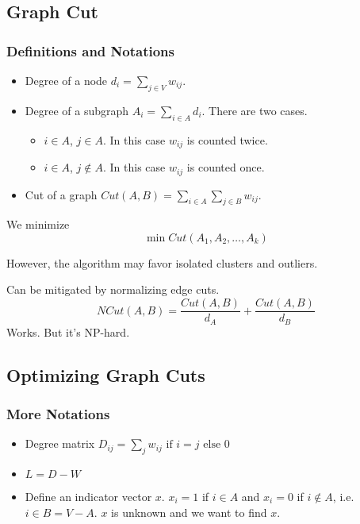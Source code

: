     \subsection{Graph Cut}
        \subsubsection{Definitions and Notations}
            \begin{itemize}
                \item Degree of a node $d_i = \sum_{j\in V}w_{ij}$.
                \item Degree of a subgraph $A_i = \sum_{i \in A}d_i$. There are two cases.
                    \begin{itemize}
                        \item $i \in A$, $j \in A$. In this case $w_{ij}$ is counted twice.
                        \item $i \in A$, $j \notin A$. In this case $w_{ij}$ is counted once.
                    \end{itemize}
                \item Cut of a graph $Cut(A, B) = \sum_{i \in A}\sum_{j \in B}w_{ij}$.
            \end{itemize}

        We minimize
        \[ \min Cut(A_1,A_2,\dots,A_k) \]

        However, the algorithm may favor isolated clusters and outliers.

        Can be mitigated by normalizing edge cuts.
        \[ NCut(A,B) = \frac{Cut(A,B)}{d_A} + \frac{Cut(A,B)}{d_B}\]
        Works. But it's NP-hard.

    \subsection{Optimizing Graph Cuts}
        \subsubsection{More Notations}
            \begin{itemize}
                \item Degree matrix $D_{ij} = \text{$\sum_j w_{ij}$ if $i=j$ else $0$}$
                \item $L=D-W$
                \item Define an indicator vector $x$. $x_i = 1$ if $i \in A$ and $x_i=0$ if $i \notin A$, i.e. $i \in B = V-A$. $x$ is unknown and we want to find $x$.
            \end{itemize}

